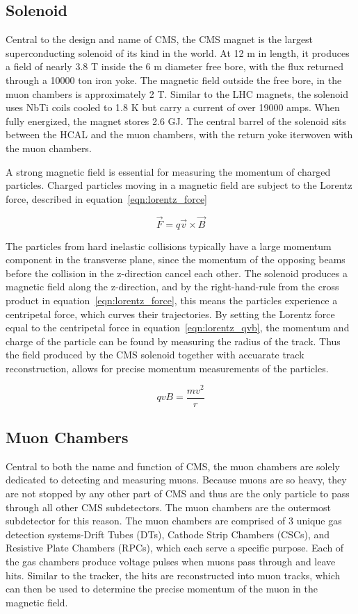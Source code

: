 \subsection{Solenoid}
Central to the design and name of CMS, the CMS magnet is the largest superconducting solenoid of its kind in the world.
At 12 m in length, it produces a field of nearly 3.8 T inside the 6 m diameter free bore, with the flux returned through a 10000 ton iron yoke.
The magnetic field outside the free bore, in the muon chambers is approximately 2 T.  
Similar to the LHC magnets, the solenoid uses NbTi coils cooled to 1.8 K but carry a current of over 19000 amps. When fully energized, the magnet
stores 2.6 GJ. The central barrel of the solenoid sits between the HCAL and the muon chambers, with the return yoke iterwoven with the muon chambers.

A strong magnetic field is essential for measuring the momentum of charged particles. Charged particles moving in a magnetic field are subject to the Lorentz force, described in
equation~\ref{eqn:lorentz_force} 

\begin{equation}
\label{eqn:lorentz_force}
 \vec{F} = q\vec{v} \times \vec{B}
\end{equation}

The particles from hard inelastic collisions typically have a large momentum component in the transverse plane, since the momentum of the opposing beams before the collision in the z-direction cancel each other.
The solenoid produces a magnetic field along the z-direction, and by the right-hand-rule from the cross product in equation~\ref{eqn:lorentz_force}, this means the particles experience a centripetal force, which
curves their trajectories. By setting the Lorentz force equal to the centripetal force in equation~\ref{eqn:lorentz_qvb}, the momentum and charge of the particle can be found by measuring the radius of the track. 
Thus the field produced by the CMS solenoid together with accuarate track reconstruction, allows for precise momentum measurements of the particles.

\begin{equation}
\label{eqn:lorentz_qvb}
 qvB = \frac{mv^{2}}{r}
\end{equation}

\subsection{Muon Chambers}
Central to both the name and function of CMS, the muon chambers are solely dedicated to detecting and measuring muons.
Because muons are so heavy, they are not stopped by any other part of CMS and thus are the only particle to pass through all other CMS subdetectors. The muon chambers are the outermost subdetector for this reason. The muon chambers are comprised of 3 unique gas detection systems-Drift Tubes (DTs), Cathode Strip Chambers (CSCs), and Resistive Plate Chambers (RPCs), which each serve a specific purpose. Each of the gas chambers produce voltage pulses when muons pass through and leave hits. Similar to the tracker, the hits are reconstructed into muon tracks, which can then be used to determine the precise momentum of the muon in the magnetic field.  


